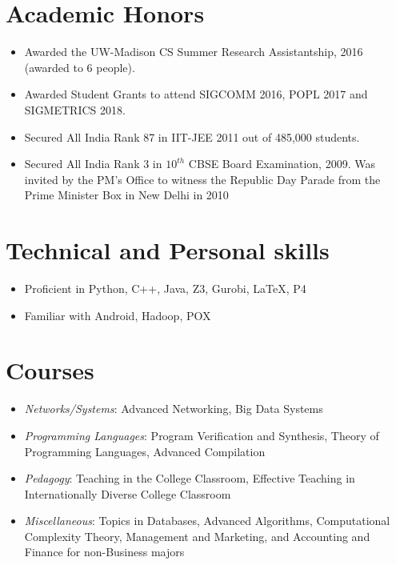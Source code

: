 \documentclass[11pt,a4paper,sans]{moderncv}        %
\begin{document}
\section{Academic  Honors}
\begin{itemize}
\item{Awarded the UW-Madison CS Summer Research Assistantship, 2016 (awarded to 6 people).}
\item{Awarded Student Grants to attend SIGCOMM 2016, POPL 2017 and SIGMETRICS 2018.}
\item{Secured All India Rank 87 in IIT-JEE 2011 out of 485,000 students.}
\item{Secured All India Rank 3 in $10^{th}$ CBSE Board Examination, 2009. Was invited by the PM's Office to witness the Republic Day Parade from the Prime Minister Box in New Delhi in 2010}
\end{itemize}

\section{Technical and Personal skills}
\begin{itemize}
\item Proficient in Python, C++, Java, Z3, Gurobi, \LaTeX, P4
\item Familiar with Android, Hadoop, POX
\end{itemize}

\section{Courses}
\begin{itemize}
	\item \emph{Networks/Systems}: Advanced Networking, Big Data Systems
	\item \emph{Programming Languages}: Program Verification and Synthesis,
	Theory of Programming Languages, Advanced Compilation
	\item \emph{Pedagogy}: Teaching in the College Classroom, Effective
	Teaching in Internationally Diverse College Classroom
	\item \emph{Miscellaneous}: Topics in Databases, Advanced Algorithms,
	Computational Complexity Theory, Management and Marketing, and Accounting and Finance
	for non-Business majors
\end{itemize}
\end{document}
